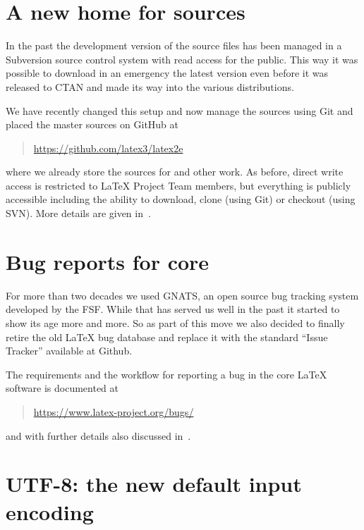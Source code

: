 \documentclass{ltnews}
\begin{document}
\maketitle
\tableofcontents

\setlength{}

\section{A new home for \LaTeXe{} sources}

In the past the development version of the \LaTeXe{} source files has
been managed in a Subversion source control system with read access
for the public. This way it was possible to download in an emergency
the latest version even before it was released to CTAN and made its
way into the various distributions.

We have recently changed this setup and now manage the sources using
Git and placed the master sources on GitHub at
\begin{quote}
\url{https://github.com/latex3/latex2e}
\end{quote}
where we already store the sources
for  and other work. As before, direct write access is restricted
to \LaTeX{} Project Team members, but everything is publicly accessible
including the ability to download, clone (using Git) or checkout
(using SVN). More details are given in~\cite{Mittelbach:TB39-1}.

\section{Bug reports for core \LaTeXe{}}

For more than two decades we used GNATS, an open source bug tracking
system developed by the FSF. While that has served us well in the past
it started to show its age more and more. So as part of this move we
also decided to finally retire the old \LaTeX{} bug database and replace
it with the standard ``Issue Tracker'' available at Github.

The requirements and the workflow for reporting a bug in the core
\LaTeX{} software is documented at
\begin{quote}
\url{https://www.latex-project.org/bugs/}
\end{quote}
and with further details also discussed in~\cite{Mittelbach:TB39-1}.


\section{UTF-8: the new default input encoding}
\end{document}
